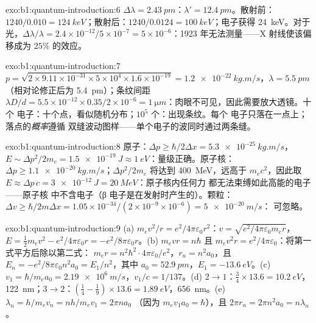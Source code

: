 \begin{solution}{exo:b1:quantum-introduction:6}
$\Delta\lambda = \qty{2.43}{pm}$：$\lambda' = \qty{12.4}{pm}$。散射前：$1240/0.010 =
\qty{124}{keV}$；散射后：$1240/0.0124 = \qty{100}{keV}$；电子获得
\qty{24}{keV}。对于光，$\Delta\lambda/\lambda = 2.4 \times 10^{-12}/5 \times 10^{-7} = 5 \times
10^{-6}$：1923 年无法测量——X 射线使该偏移成为 $25\%$ 的效应。
\end{solution}

\begin{solution}{exo:b1:quantum-introduction:7}
$p = \sqrt{2 \times 9.11 \times 10^{-31} \times 5 \times 10^4 \times 1.6 \times 10^{-19}} =
\qty{1.2e-22}{kg.m/s}$，$\lambda = \qty{5.5}{pm}$（相对论修正后为
\qty{5.4}{pm}）；条纹间距 $\lambda D/d = 5.5 \times 10^{-12} \times 0.35/2 \times 10^{-6}
= \qty{1}{\micro m}$：肉眼不可见，因此需要放大透镜。十个
电子：十个点，看似随机分布；$10^5$ 个：出现条纹。每个
电子只落在一点上；落点的\emph{概率}遵循
双缝波动图样——单个电子的波同时通过两条缝。
\end{solution}

\begin{solution}{exo:b1:quantum-introduction:8}
原子：$\Delta p \geq \hbar/2\Delta x = \qty{5.3e-25}{kg.m/s}$，$E \sim \Delta p^2/2m_e =
\qty{1.5e-19}{J} \approx \qty{1}{eV}$：量级正确。原子核：$\Delta p \geq
\qty{1.1e-20}{kg.m/s}$；$\Delta p^2/2m_e$ 将达到 \qty{400}{MeV}，远高于
$m_ec^2$，因此取 $E \approx \Delta p\,c = \qty{3e-12}{J} = \qty{20}{MeV}$：原子核内任何力
都无法束缚如此高能的电子——原子核
中不含电子（β 电子是在发射时产生的）。颗粒：$\Delta v \geq
\hbar/2m\Delta x = 1.05 \times 10^{-34}/(2 \times 10^{-9} \times 10^{-6}) = \qty{5e-20}{m/s}$：
可忽略。
\end{solution}

\begin{solution}{exo:b1:quantum-introduction:9}
(a) $m_ev^2/r = e^2/4\pi\varepsilon_0r^2$：$v = \sqrt{e^2/4\pi\varepsilon_0m_er}$，$E =
\tfrac12m_ev^2 - e^2/4\pi\varepsilon_0r = -e^2/8\pi\varepsilon_0r$。(b) $m_evr = n\hbar$ 且
$m_ev^2r = e^2/4\pi\varepsilon_0$：将第一式平方后除以第二式：
$m_er = n^2\hbar^2 \cdot 4\pi\varepsilon_0/e^2$，$r_n = n^2a_0$，且 $E_n = -e^2/8\pi\varepsilon_0n^2a_0
= E_1/n^2$，其中 $a_0 = \qty{52.9}{pm}$，$E_1 = \qty{-13.6}{eV}$。(c) $v_1 =
\hbar/m_ea_0 = \qty{2.19e6}{m/s}$，$v_1/c = 1/137$。(d) $2 \to 1$：$\tfrac34 \times
13.6 = \qty{10.2}{eV}$，\qty{122}{nm}；$3 \to 2$：$(\tfrac14 - \tfrac19) \times 13.6 =
\qty{1.89}{eV}$，\qty{656}{nm}。(e) $\lambda_n = h/m_ev_n = nh/m_ev_1 = 2\pi na_0$
（因为 $m_ev_1a_0 = \hbar$），且 $2\pi r_n = 2\pi n^2a_0 = n\lambda_n$。
\end{solution}

